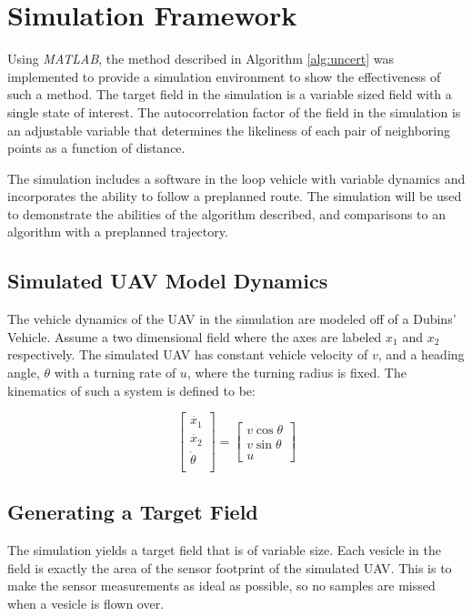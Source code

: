 \chapter{Simulation Framework}
Using \textit{MATLAB}, the method described in Algorithm \ref{alg:uncert} was implemented to provide a simulation environment to show the effectiveness of such a method. The target field in the simulation is a variable sized field with a single state of interest. The autocorrelation factor of the field in the simulation is an adjustable variable that determines the likeliness of each pair of neighboring points as a function of distance. 

The simulation includes a software in the loop vehicle with variable dynamics and incorporates the ability to follow a preplanned route. The simulation will be used to demonstrate the abilities of the algorithm described, and comparisons to an algorithm with a preplanned trajectory. 

\section{Simulated UAV Model Dynamics}
The vehicle dynamics of the UAV in the simulation are modeled off of a Dubins' Vehicle. Assume a two dimensional field where the axes are labeled $x_1$ and $x_2$ respectively. The simulated UAV has constant vehicle velocity of $v$, and a heading angle, $\theta$ with a turning rate of $u$, where the turning radius is fixed. The kinematics of such a system is defined to be:

\begin{equation}
	\begin{bmatrix}
		\dot{x_1} \\
		\dot{x_2} \\
		\dot{\theta} \\
	\end{bmatrix} = 
	\begin{bmatrix}
		v \cos \theta \\
		v \sin \theta \\
		u
	\end{bmatrix}
\end{equation}

\section{Generating a Target Field}
The simulation yields a target field that is of variable size. Each vesicle in the field is exactly the area of the sensor footprint of the simulated UAV. This is to make the sensor measurements as ideal as possible, so no samples are missed when a vesicle is flown over.


